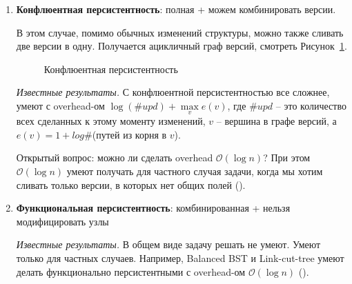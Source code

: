 \begin{enumerate}
{\it Известные результаты.} Если у структуры данных константная входящая степень для всех узлов, то ее можно наделить полной персистентностью также с константным мультипликативным overhead-ом. Правда в случае полной персистентности такого overhead-а умеют добиваться только амортизированно (\cite{driscoll1986making}), и можно ли добиться его в худшем случае --- открытый вопрос.  

\item {\bf Конфлюентная персистентность}: полная + можем комбинировать версии.

В этом случае, помимо обычных изменений структуры, можно также сливать две версии в одну. 
Получается ацикличный граф версий, смотреть Рисунок~\ref{fig:TanyaAcyc}.

\begin{figure}[h] \centering
{}
	\caption{Конфлюентная персистентность}
	\label{fig:TanyaAcyc}
\end{figure}


{\it Известные результаты.} С конфлюентной персистентностью все сложнее, \cite{fiat2003making} умеют с overhead-ом $\log(\#upd) + \max\limits_v e(v)$, 
где $\#upd$ -- это количество всех сделанных к этому моменту изменений, $v$ -- вершина в графе версий, а $e(v) = 1 + log\#$(путей из корня в $v$).

Открытый вопрос: можно ли сделать overhead $\mathcal{O}(\log n)$?
При этом $\mathcal{O}(\log n)$ умеют получать для частного случая задачи, когда мы хотим сливать только версии, в которых нет общих полей (\cite{collette2012confluent}).

\item {\bf Функциональная персистентность}: комбинированная + нельзя модифицировать узлы

{\it Известные результаты.} В общем виде задачу решать не умеют.
Умеют только для частных случаев. Например, Balanced BST и Link-cut-tree умеют делать функционально персистентными с overhead-ом $\mathcal{O}(\log n)$ (\cite{demaine2008confluently}).

\end{enumerate}

